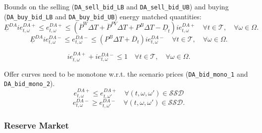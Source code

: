 Bounds on the selling (\verb|DA_sell_bid_LB| and \verb|DA_sell_bid_UB|) and buying (\verb|DA_buy_bid_LB| and \verb|DA_buy_bid_UB|) energy matched quantities:
\begin{equation} \label{EQ:DA_sell_bid_LB1}
    \underline{E}^{DA} ie^{DA+}_{t, \omega} \leq e^{DA+}_{t, \omega} \leq (\overline{P}^W \Delta T + \overline{P}^{PV} \Delta T + P^B \Delta T - \underline{D}_t) ie^{DA+}_{t, \omega}  \quad \forall t \in \mathcal{T}, \quad \forall \omega \in \Omega.
\end{equation}
\begin{equation} \label{EQ:DA_buy_bid_LB1}
	\underline{E}^{DA} ie^{DA-}_{t, \omega} \leq e^{DA-}_{t, \omega} \leq (P^B \Delta T + \overline{D}_t) ie^{DA-}_{t, \omega} \quad \forall t \in \mathcal{T}, \quad \forall \omega \in \Omega.
\end{equation}

\begin{equation} \label{EQ:DA_buy_or_sell1}
	ie^{DA+}_{t, \omega} + ie^{DA-}_{t, \omega} \leq 1 \quad \forall t \in \mathcal{T}, \quad \forall \omega \in \Omega.
\end{equation}

Offer curves need to be monotone w.r.t. the scenario prices (\verb|DA_bid_mono_1| and \verb|DA_bid_mono_2|).
\begin{equation} \label{EQ:DA_bid_mono_11}
	e^{DA+}_{t, \omega} \leq e^{DA+}_{t, \omega'} \quad \forall (t, \omega, \omega') \in \mathcal{SSD}
\end{equation} 
\begin{equation} \label{EQ:DA_bid_mono_21}
	e^{DA-}_{t, \omega} \geq e^{DA-}_{t, \omega'} \quad \forall (t, \omega, \omega') \in \mathcal{SSD}.
\end{equation}

\subsubsection{Reserve Market}

